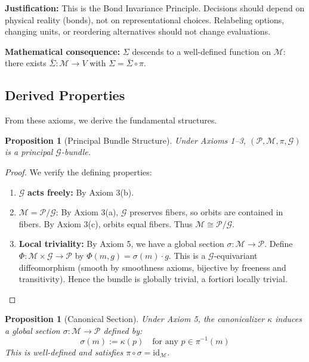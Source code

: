 \documentclass[11pt]{article}
\newtheorem{proposition}[theorem]{Proposition}
\begin{document}
\textbf{Justification:} This is the Bond Invariance Principle. Decisions should depend on physical reality (bonds), not on representational choices. Relabeling options, changing units, or
reordering alternatives should not change evaluations.

\textbf{Mathematical consequence:} $\Sigma$ descends to a well-defined function on $\mathcal{M}$: there exists
$\bar{\Sigma} : \mathcal{M} \to V$ with $\Sigma = \bar{\Sigma} \circ \pi$.

\subsection{Derived Properties}

From these axioms, we derive the fundamental structures.

\begin{proposition}[Principal Bundle Structure]
\label{prop:bundle}
Under Axioms 1--3, $(\mathcal{P}, \mathcal{M}, \pi, \mathcal{G})$ is a principal $\mathcal{G}$-bundle.
\end{proposition}

\begin{proof}
We verify the defining properties:
\begin{enumerate}
    \item $\mathcal{G}$ \textbf{acts freely:} By Axiom 3(b).

    \item $\mathcal{M} = \mathcal{P}/\mathcal{G}$: By Axiom 3(a), $\mathcal{G}$ preserves fibers, so orbits are contained in fibers. By Axiom 3(c), orbits equal fibers. Thus $\mathcal{M} \cong \mathcal{P}/\mathcal{G}$.

    \item \textbf{Local triviality:} By Axiom 5, we have a global section $\sigma : \mathcal{M} \to \mathcal{P}$. Define $\Phi : \mathcal{M} \times \mathcal{G} \to \mathcal{P}$ by $\Phi(m, g) = \sigma(m) \cdot g$. This is a $\mathcal{G}$-equivariant diffeomorphism (smooth by smoothness axioms, bijective by freeness and transitivity). Hence the bundle is globally trivial, a fortiori locally trivial. \qedhere
\end{enumerate}
\end{proof}

\begin{proposition}[Canonical Section]
\label{prop:section}
Under Axiom 5, the canonicalizer $\kappa$ induces a global
section $\sigma : \mathcal{M} \to \mathcal{P}$ defined by:
\[
\sigma(m) := \kappa(p) \quad \text{for any } p \in \pi^{-1}(m)
\]
This is well-defined and satisfies $\pi \circ \sigma = \mathrm{id}_{\mathcal{M}}$.
\end{proposition}
\end{document}
